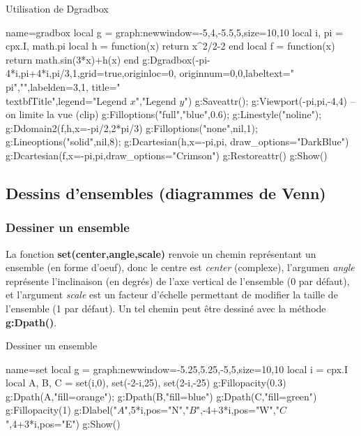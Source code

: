 \begin{demo}{Utilisation de Dgradbox}
\begin{luadraw}{name=gradbox}
local g = graph:new{window={-5,4,-5.5,5},size={10,10}}
local i, pi = cpx.I, math.pi
local h = function(x) return x^2/2-2 end
local f = function(x) return math.sin(3*x)+h(x) end
g:Dgradbox({-pi-4*i,pi+4*i,pi/3,1},{grid=true,originloc=0, originnum={0,0},labeltext={"\\pi",""},labelden={3,1}, title="\\textbf{Title}",legend={"Legend $x$","Legend $y$"}})
g:Saveattr(); g:Viewport(-pi,pi,-4,4) -- on limite la vue (clip)
g:Filloptions("full","blue",0.6); g:Linestyle("noline"); g:Ddomain2(f,h,{x={-pi/2,2*pi/3}})
g:Filloptions("none",nil,1); g:Lineoptions("solid",nil,8); g:Dcartesian(h,{x={-pi,pi}, draw_options="DarkBlue"})
g:Dcartesian(f,{x={-pi,pi},draw_options="Crimson"})
g:Restoreattr()
g:Show()
\end{luadraw}
\end{demo}

\subsection{Dessins d'ensembles (diagrammes de Venn)}

\subsubsection{Dessiner un ensemble}

La fonction \textbf{set(center,angle,scale)} renvoie un chemin représentant un ensemble (en forme d'oeuf), donc le centre est \emph{center} (complexe), l'argumen \emph{angle} représente l'inclinaison (en degrés) de l'axe vertical de l'ensemble (0 par défaut), et l'argument \emph{scale} est un facteur d'échelle permettant de modifier la taille de l'ensemble (1 par défaut). Un tel chemin peut être dessiné avec la méthode \textbf{g:Dpath()}.

\begin{demo}{Dessiner un ensemble}
\begin{luadraw}{name=set}
local g = graph:new{window={-5.25,5.25,-5,5},size={10,10}}
local i = cpx.I
local A, B, C = set(i,0), set(-2-i,25), set(2-i,-25)
g:Fillopacity(0.3)
g:Dpath(A,"fill=orange"); g:Dpath(B,"fill=blue")
g:Dpath(C,"fill=green")
g:Fillopacity(1)
g:Dlabel("$A$",5*i,{pos="N"},"$B$",-4+3*i,{pos="W"},"$C$",4+3*i,{pos="E"})
g:Show()
\end{luadraw}
\end{demo}

